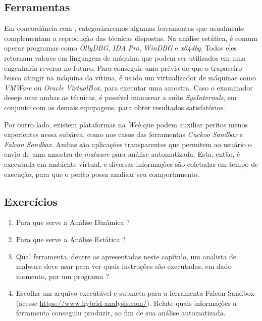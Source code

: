     \subsection{Ferramentas}
    
    \hspace{1cm}
    Em concordância com , categorizaremos algumas ferramentas que usualmente complementam a reprodução das técnicas dispostas. Na análise estática, é comum operar programas como \textit{OllyDBG}, \textit{IDA Pro}, \textit{WinDBG} e \textit{x64dbg}. Todos eles retornam valores em linguagem de máquina que podem ser utilizados em uma engenharia reversa no futuro. Para conseguir uma prévia do que o trapaceiro busca atingir na máquina da vítima, é usado um virtualizador de máquinas como \textit{VMWare} ou \textit{Oracle VirtualBox}, para executar uma amostra. Caso o examinador deseje usar ambas as técnicas, é possível manusear a suíte \textit{SysInternals}, em conjunto com as demais equipagens, para obter resultados satisfatórios.
    
    \vspace{4mm}

    \hspace{1cm}
    Por outro lado, existem plataformas na \textit{Web} que podem auxiliar peritos menos experientes nessa subárea, como nos casos das ferramentas \textit{Cuckoo Sandbox} e \textit{Falcon Sandbox}. Ambas são aplicações transparentes que permitem ao usuário o envio de uma amostra de \textit{malware} para análise automatizada. Esta, então, é executada em ambiente virtual, e diversas informações são coletadas em tempo de execução, para que o perito possa analisar seu comportamento.

    \subsection{Exercícios}
    
    \begin{example} \label{cap7_exercicios}
        \begin{enumerate}
           \item Para que serve a Análise Dinâmica ?
           \item Para que serve a Análise Estática ?
           \item Qual ferramenta, dentre as apresentadas neste capítulo, um analista de malware deve usar para ver quais instruções são executadas, em dado momento, por um programa ?
           \item Escolha um arquivo executável e submeta para a ferramenta Falcon Sandbox (acesse \url{https://www.hybrid-analysis.com/}). Relate quais informações a ferramenta conseguiu produzir, ao fim de sua análise automatizada.
        \end{enumerate}
    \end{example}

\newpage